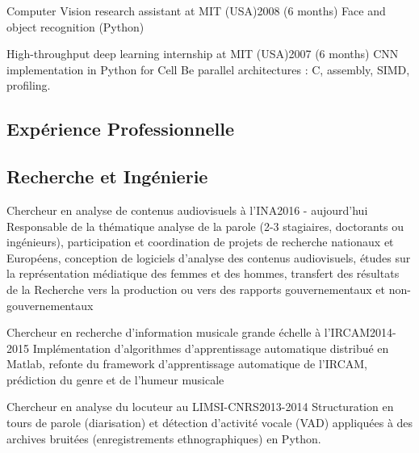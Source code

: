 \begin{en}
\begin{jobshort}{Computer Vision research assistant at MIT (USA)}{2008 (6 months)}
Face and object recognition (Python)
\end{jobshort}

\begin{jobshort}{High-throughput deep learning internship at MIT (USA)}{2007 (6 months)}
CNN implementation in Python for Cell Be parallel architectures : C, assembly, SIMD, profiling.
\end{jobshort}
\end{en}





\begin{fr}
\section{Expérience Professionnelle}


\subsection{Recherche et Ingénierie}

\begin{jobshort}{Chercheur en analyse de contenus audiovisuels à l'INA}{2016 - aujourd'hui}
Responsable de la thématique analyse de la parole (2-3 stagiaires, doctorants ou ingénieurs), participation et coordination de projets de recherche nationaux et Européens, conception de logiciels d'analyse des contenus audiovisuels, études sur la représentation médiatique des femmes et des hommes, transfert des résultats de la Recherche vers la production ou vers des rapports gouvernementaux et non-gouvernementaux
\end{jobshort}


\begin{jobshort}{Chercheur en recherche d'information musicale grande échelle à l'IRCAM}{2014-2015}
Implémentation d'algorithmes d'apprentissage automatique distribué en Matlab, refonte du framework d'apprentissage automatique de l'IRCAM, prédiction du genre et de l'humeur musicale
\end{jobshort}



\begin{jobshort}{Chercheur en analyse du locuteur au LIMSI-CNRS}{2013-2014}
Structuration en tours de parole (diarisation) et détection d'activité vocale (VAD) appliquées à des archives bruitées (enregistrements ethnographiques) en Python.
\end{jobshort}




\end{fr}
